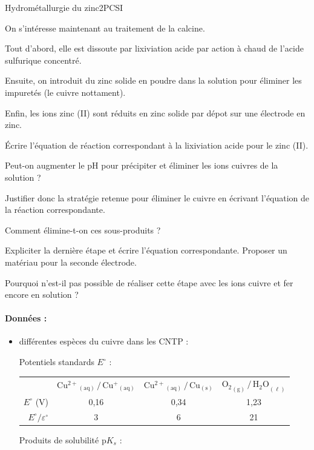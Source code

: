 \begin{exercise}{Hydrométallurgie du zinc}{2}{PCSI}
\begin{questions}
\begin{EnvUplevel}
    On s'intéresse maintenant au traitement de la calcine.
    
    Tout d'abord, elle est dissoute par lixiviation acide par action à chaud de l'acide sulfurique concentré.
    
    Ensuite, on introduit du zinc solide en poudre dans la solution pour éliminer les impuretés (le cuivre nottament).
    
    Enfin, les ions zinc (II) sont réduits en zinc solide par dépot sur une électrode en zinc.
\end{EnvUplevel}
    \question \'Ecrire l'équation de réaction correspondant à la lixiviation acide pour le zinc (II).
    
    \question Peut-on augmenter le pH pour précipiter et éliminer les ions cuivres de la solution ?
    
    \question Justifier donc la stratégie retenue pour éliminer le cuivre en écrivant l’équation de la réaction correspondante.
    
    \question Comment élimine-t-on ces sous-produits ?
    
    \question Expliciter la dernière étape et écrire l'équation correspondante. Proposer un matériau pour la seconde électrode.
    
    \question Pourquoi n’est-il pas possible de réaliser cette étape avec les ions cuivre et fer encore en solution ?

\end{questions}

\paragraph{Données :}

\begin{itemize}
    \item différentes espèces du cuivre dans les CNTP :

\hspace{-2em}\begin{minipage}{.68\linewidth}
Potentiels standards $E^\circ$ : \\[1em]
\begin{tabularx}{0.99\linewidth}{rCCC}
    \hline
    & $\mathrm{{Cu^{2+}}_{(aq)} \,/\, {Cu^+}_{(aq)}}$
    & $\mathrm{{Cu^{2+}}_{(aq)} \,/\, {Cu}_{(s)}}$
    & $\mathrm{{O_2}_{(g)} \,/\, {H_2O}_{(\ell)}}$ \\
    $E^\circ$ (V) & 0,16 & 0,34 & 1,23 \\
    $E^\circ / \varepsilon^\circ$ & 3 & 6 & 21 \\ \hline\hline 
\end{tabularx}
\end{minipage}
\begin{minipage}{.32\linewidth}
Produits de solubilité p$K_s$ :


\end{minipage}
\end{itemize}
\end{exercise}
